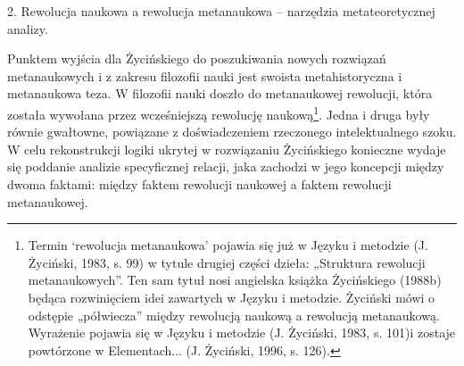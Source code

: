 \documentclass{article}
\begin{document}
2. Rewolucja naukowa a rewolucja metanaukowa – narzędzia metateoretycznej analizy.

Punktem wyjścia dla Życińskiego do poszukiwania nowych rozwiązań metanaukowych i z zakresu filozofii nauki jest swoista
metahistoryczna i metanaukowa teza. W filozofii nauki doszło do metanaukowej rewolucji, która została wywołana przez
wcześniejszą rewolucję naukową\footnote{Termin ‘rewolucja metanaukowa’ pojawia się już w Języku i metodzie
\label{ref:RNDX1VVM27OlW}(J. Życiński, 1983, s. 99) w tytule drugiej części dzieła: „Struktura rewolucji
metanaukowych”. Ten sam tytuł nosi angielska książka Życińskiego \label{ref:RNDZhnNjGxqOR}(1988b) będąca rozwinięciem
idei zawartych w Języku i metodzie. Życiński mówi o odstępie „półwiecza” między rewolucją naukową a rewolucją
metanaukową. Wyrażenie pojawia się w Języku i metodzie \label{ref:RNDIDOT0gvEdV}(J. Życiński, 1983, s. 101)i zostaje
powtórzone w Elementach...  \label{ref:RNDTq4UOwaMNQ}(J. Życiński, 1996, s. 126).}. Jedna i druga były równie
gwałtowne, powiązane z doświadczeniem rzeczonego intelektualnego szoku. W celu rekonstrukcji logiki ukrytej w
rozwiązaniu Życińskiego konieczne wydaje się poddanie analizie specyficznej relacji, jaka zachodzi w jego koncepcji
między dwoma faktami: między faktem rewolucji naukowej a faktem rewolucji metanaukowej.
\end{document}
